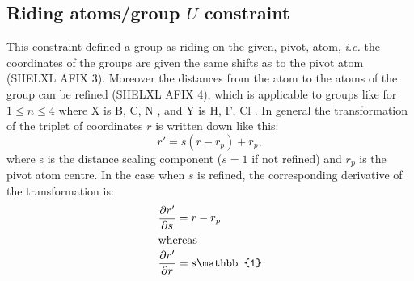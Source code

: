 \documentclass[pdf]{iucr}
\newcommand{\identity}{\mathbb{1}}
\newcommand{\partialder}[2]{\frac{\partial #1}{\partial #2}}
\begin{document}
\subsection{Riding atoms/group $U$ constraint}
This constraint defined a group as riding on the given, pivot, atom, \emph{i.e.} the coordinates of the groups are given the same shifts as to the pivot atom (SHELXL AFIX 3). Moreover the distances from the atom to the atoms of the group can be refined (SHELXL AFIX 4), which is applicable to groups like  for $1 \leq n \leq 4$ where X is B, C, N , and Y is H, F, Cl . In general the transformation of the triplet of coordinates $r$ is written down like this:
\begin{equation}
r' = s(r-r_{p}) + r_{p}, \label{eqn:isometry}
\end{equation}
where s is the distance scaling component ($s=1$ if not refined) and $r_{p}$ is the pivot atom centre. In the case when $s$ is refined, the corresponding derivative of the transformation is:
\begin{align}
\partialder{r'}{s} &= r-r_{p} \\
\shortintertext{whereas}
\partialder{r'}{r} &= s \identity
\end{align}
\end{document}
